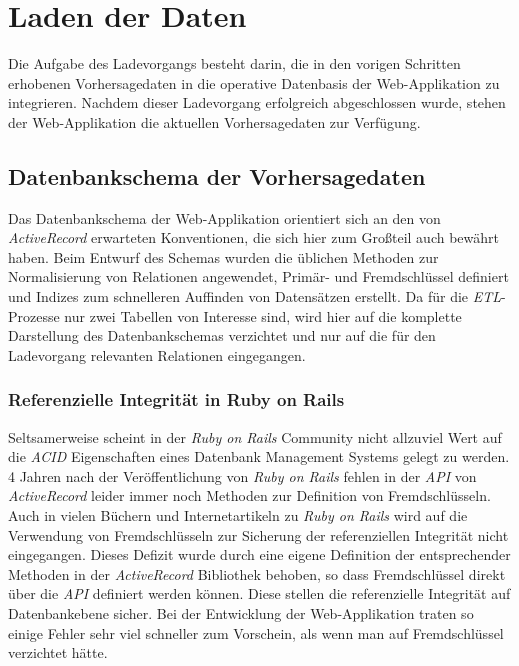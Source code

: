 \section{Laden der Daten}
Die Aufgabe des Ladevorgangs besteht darin, die in den vorigen
Schritten erhobenen Vorhersagedaten in die operative Datenbasis der
Web-Applikation zu integrieren. Nachdem dieser Ladevorgang erfolgreich
abgeschlossen wurde, stehen der Web-Applikation die aktuellen
Vorhersagedaten zur Verfügung. 

\subsection{Datenbankschema der Vorhersagedaten}
Das Datenbankschema der Web-Applikation orientiert sich an den von
\textit{ActiveRecord} erwarteten Konventionen, die sich hier zum
Großteil auch bewährt haben. Beim Entwurf des Schemas wurden die
üblichen Methoden zur Normalisierung von Relationen angewendet,
Primär- und Fremdschlüssel definiert und Indizes zum schnelleren
Auffinden von Datensätzen erstellt. Da für die \textit{ETL}-Prozesse
nur zwei Tabellen von Interesse sind, wird hier auf die komplette
Darstellung des Datenbankschemas verzichtet und nur auf die für den
Ladevorgang relevanten Relationen eingegangen.

\subsubsection{Referenzielle Integrität in Ruby on Rails}
Seltsamerweise scheint in der \textit{Ruby on Rails} Community nicht
allzuviel Wert auf die \textit{ACID}  Eigenschaften eines Datenbank
Management Systems gelegt zu werden. 4 Jahren nach der
Veröffentlichung von \textit{Ruby on Rails} fehlen in der \textit{API}
von \textit{ActiveRecord} leider immer noch Methoden zur Definition
von Fremdschlüsseln. Auch in vielen Büchern und Internetartikeln zu
\textit{Ruby on Rails} wird auf die Verwendung von Fremdschlüsseln zur
Sicherung der referenziellen Integrität nicht eingegangen. Dieses
Defizit wurde durch eine eigene Definition der entsprechender Methoden
in der \textit{ActiveRecord} Bibliothek behoben, so dass
Fremdschlüssel direkt über die \textit{API} definiert werden
können. Diese stellen die referenzielle Integrität auf Datenbankebene
sicher. Bei der Entwicklung der Web-Applikation traten so einige
Fehler sehr viel schneller zum Vorschein, als wenn man auf
Fremdschlüssel verzichtet hätte.


